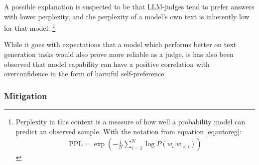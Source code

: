\documentclass[noindent,nohyp,parspace,titlepage,twoside,12pt]{article}
\begin{document}
      A possible explanation is suspected \cite{biasself} to be that LLM-judges
      tend to prefer answers with lower perplexity, and the perplexity of a
      model's own text is inherently low for that model. \footnote{Perplexity
      in this context is a measure of how well a probability model can predict
      an observed sample. With the notation from equation \ref{eqautoreg}:
      \begin{align*}
        \text{PPL} =  \exp\left(
                        - \frac{1}{N} \sum_{i=1}^N \log P(w_i | w_{<i})
                      \right)
      \end{align*}}

      While it goes with expectations that a model which performs better on
      text generation tasks would also prove more reliable as a judge, is has
      also been observed \cite{reason} that model capability can have a positive
      correlation with overconfidence in the form of harmful self-preference.

      \subsubsection{Mitigation}
\end{document}
